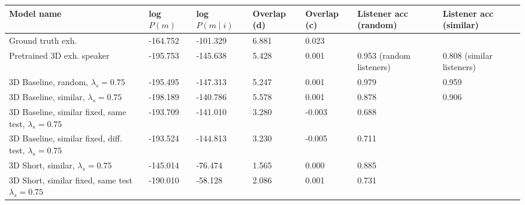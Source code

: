\begin{table}[] 
	\begin{tabularx}{\textwidth}{|X|l|l|X|X|X|X|}
		\hline
		\textbf{Model name}                                    & \textbf{log $P(m)$} & \textbf{log $P(m \mid i)$} & \textbf{Overlap (d)} & \textbf{Overlap (c)} & \textbf{Listener acc (random)} & \textbf{Listener acc (similar)} \\ \hline
		Ground truth exh.       &      -164.752            &         -101.329               &       6.881             &      0.023               &                 &                \\ \hline
		Pretrained 3D exh. speaker                            &       -195.753            &         -145.638               &        5.428              &      0.001                & 0.953 (random listeners)                 & 0.808 (similar listeners)                 \\ \hline
		3D Baseline, random, $\lambda_s = 0.75$  &       -195.495        &           -147.313           &          5.247            &         0.001             & 0.979                                    &                        0.959                   \\ \hline
		3D Baseline, similar, $\lambda_s = 0.75$ &      -198.189             &       -140.786                 &           5.578           &        0.001              & 0.878                      &            0.906                        \\ \hline
		3D Baseline, similar fixed, same test, $\lambda_s = 0.75$ &       -193.709            &    -141.010                  &        3.280            &      -0.003         &            0.688       &                              \\ \hline
		3D Baseline, similar fixed, diff. test, $\lambda_s = 0.75$ &      -193.524             &          -144.813            &       3.230             &     -0.005          &     0.711              &                              \\ \hline
		3D Short, similar, $\lambda_s = 0.75$&      -145.014             &      -76.474                  &             1.565         &         0.000             &                   0.885                       &                                           \\ \hline
		3D Short, similar fixed, same test $\lambda_s = 0.75$&      -190.010           &     -58.128                  &             2.086         &         0.001             &                   0.731                       &                                           \\ \hline

\end{tabularx}
\end{table}
